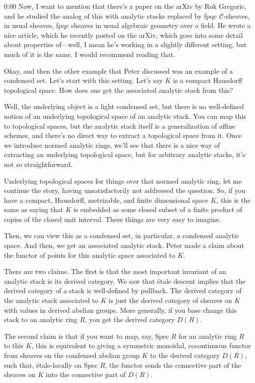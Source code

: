 \begin{unfinished}{0:00}
Now, I want to mention that there's a paper on the arXiv by Rok Gregoric, and he studied the analog of this with analytic stacks replaced by fpqc $\mathcal{C}$-sheaves, in usual sheaves, fpqc sheaves in usual algebraic geometry over a field. He wrote a nice article, which he recently posted on the arXiv, which goes into some detail about properties of---well, I mean he's working in a slightly different setting, but much of it is the same. I would recommend reading that.

Okay, and then the other example that Peter discussed was an example of a condensed set. Let's start with this setting. Let's say $K$ is a compact Hausdorff topological space. How does one get the associated analytic stack from this?

Well, the underlying object is a light condensed set, but there is no well-defined notion of an underlying topological space of an analytic stack. You can map this to topological spaces, but the analytic stack itself is a generalization of affine schemes, and there's no direct way to extract a topological space from it. Once we introduce normed analytic rings, we'll see that there is a nice way of extracting an underlying topological space, but for arbitrary analytic stacks, it's not so straightforward.

Underlying topological spaces for things over that normed analytic ring, let me continue the story, having unsatisfactorily not addressed the question. So, if you have a compact, Hausdorff, metrizable, and finite dimensional space $K$, this is the same as saying that $K$ is embedded as some closed subset of a finite product of copies of the closed unit interval. These things are very easy to imagine.

Then, we can view this as a condensed set, in particular, a condensed analytic space. And then, we get an associated analytic stack. Peter made a claim about the functor of points for this analytic space associated to $K$.

There are two claims. The first is that the most important invariant of an analytic stack is its derived category. We saw that étale descent implies that the derived category of a stack is well-defined by pullback. The derived category of the analytic stack associated to $K$ is just the derived category of sheaves on $K$ with values in derived abelian groups. More generally, if you base change this stack to an analytic ring $R$, you get the derived category $D(R)$.

The second claim is that if you want to map, say, $\text{Spec } R$ for an analytic ring $R$ to this $K$, this is equivalent to giving a symmetric monoidal, cocontinuous functor from sheaves on the condensed abelian group $K$ to the derived category $D(R)$, such that, étale-locally on $\text{Spec } R$, the functor sends the connective part of the sheaves on $K$ into the connective part of $D(R)$.


\end{unfinished}
